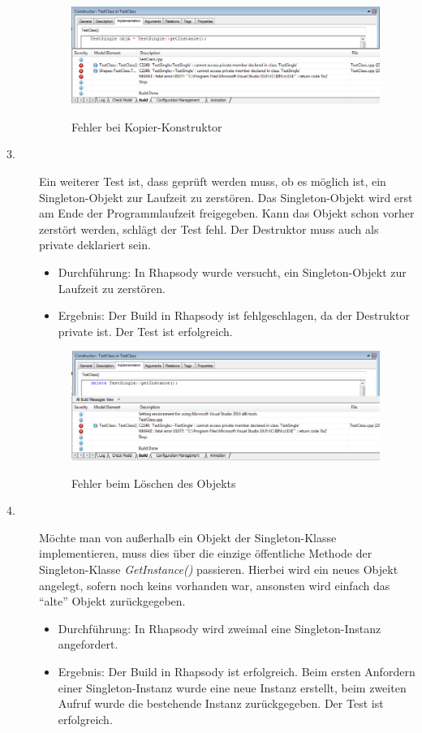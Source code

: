 \begin{description}
 \begin{figure}[!htbp]
	\centering
	\includegraphics[width=0.99\textwidth]{content/pictures/tests/singleton/KopierError1}
	\label{pic:bild}
	\caption{Fehler bei Kopier-Konstruktor}
\end{figure}
  
  \item[3.]
  Ein weiterer Test ist, dass geprüft werden muss, ob es möglich ist, ein Singleton-Objekt zur Laufzeit zu zerstören. Das Singleton-Objekt wird erst am Ende der Programmlaufzeit freigegeben. Kann das Objekt schon vorher zerstört werden, schlägt der Test fehl. Der Destruktor muss auch als private deklariert sein.
  \begin{itemize}
  	\item{Durchführung:}
  	In Rhapsody wurde versucht, ein Singleton-Objekt zur Laufzeit zu zerstören.
  	\item{Ergebnis:}
  	Der Build in Rhapsody ist fehlgeschlagen, da der Destruktor private ist. Der
  	Test ist erfolgreich.
  \end{itemize}
  \begin{figure}[!htbp]
	\centering
	\includegraphics[width=0.99\textwidth]{content/pictures/tests/singleton/deleteError1}
	\label{pic:bild}
	\caption{Fehler beim Löschen des Objekts}
\end{figure}

  \item[4.]
  Möchte man von außerhalb ein Objekt der Singleton-Klasse implementieren, muss dies über die einzige öffentliche Methode der Singleton-Klasse \textit{GetInstance()} passieren. Hierbei wird ein neues Objekt angelegt, sofern noch keins vorhanden war, ansonsten wird einfach das \enquote{alte} Objekt zurückgegeben.
  \begin{itemize}
  	\item{Durchführung:}
  	In Rhapsody wird zweimal eine Singleton-Instanz angefordert.
  	\item{Ergebnis:}
  	Der Build in Rhapsody ist erfolgreich. Beim ersten Anfordern einer
  	Singleton-Instanz wurde eine neue Instanz erstellt, beim zweiten Aufruf wurde
  	die bestehende Instanz zurückgegeben.
  	Der Test ist erfolgreich.
  \end{itemize}
  

\end{description}
